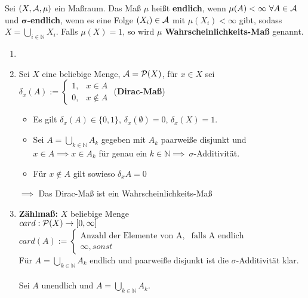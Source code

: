 \documentclass[11pt,a4paper,fleqn,openany]{report}
\begin{document}
    \begin{definition}
      Sei $(X, \mathcal{A}, \mu)$ ein Maßraum. Das Maß $\mu$ heißt \textbf{endlich}, wenn $\mu(A) < \infty\ \forall A \in \mathcal{A}$ und $\bm{\sigma}$\textbf{-endlich}, wenn es eine Folge $(X_i) \in \mathcal{A}$ mit $\mu(X_i) < \infty$ gibt, sodass $X=\bigcup\limits_{i \in \mathbb{N}} X_i$. Falls $\mu(X) = 1$, so wird $\mu$ \textbf{Wahrscheinlichkeits-Maß} genannt.
    \end{definition}

    \begin{example}
      \begin{enumerate}
        \item[]
        \item Sei $X$ eine beliebige Menge, $\mathcal{A} = \mathcal{P}(X)$, für $x \in X$ sei $\delta_x(A) := \begin{cases}1, & x \in A\\0, & x \notin A\end{cases}$ (\textbf{Dirac-Maß})
              \begin{itemize}
                \item Es gilt $\delta_x(A) \in \{0,1\}$, $\delta_x(\emptyset) = 0$, $\delta_x(X) = 1$.
                \item Sei $A = \bigcup\limits_{k \in \mathbb{N}} A_k$ gegeben mit $A_k$ paarweiße disjunkt und $x \in A \implies x \in A_k$ für genau ein $k \in \mathbb{N} \implies\ \sigma$-Additivität.
                \item Für $x \notin A$ gilt sowieso $\delta_x{A} = 0$
              \end{itemize}
              $\implies$ Das Dirac-Maß ist ein Wahrscheinlichkeits-Maß
        \item \textbf{Zählmaß:} $X$ beliebige Menge \\
              $card: \mathcal{P}(X) \to [0, \infty]$\\
              $card(A) := \begin{cases}\text{Anzahl der Elemente von A}, & \text{falls A endlich}\\\infty, sonst\end{cases}$\\
              Für $A = \bigcup\limits_{k\in \mathbb{N}}A_k$ endlich und paarweiße disjunkt ist die $\sigma$-Additivität klar.\\
              \\
              Sei $A$ unendlich und $A = \bigcup\limits_{k\in \mathbb{N}}A_k$.

\end{enumerate}
\end{example}
\end{document}
